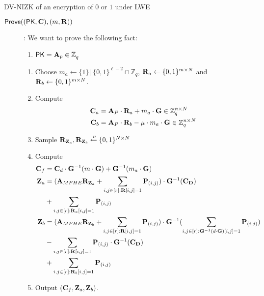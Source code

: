 \begin{subsection}{DV-NIZK of an encryption of $0$ or $1$ under LWE}
\begin{description}
    \item[${\mathsf{Prove}}((\mathsf{PK}, \mathbf{C}), (m, \mathbf{R}))$]:
      We want to prove the following fact:
      \begin{enumerate}
      \item $\mathsf{PK} = \mathbf{A}_p \in \mathbb{Z}_q^{}$
      \end{enumerate}
      \begin{enumerate}
      \item Choose $m_a \gets \{1\}||\{0,1\}^{\ell-2} \cap \mathbb{Z}_q$, $\mathbf{R}_a \gets \{0,1\}^{m \times N}$ and $\mathbf{R}_b \gets \{0,1\}^{m \times N}$.
      \item Compute
        \begin{align*}
          \mathbf{C}_a &= \mathbf{A}_P \cdot \mathbf{R}_a + m_a \cdot \mathbf{G} \in \mathbb{Z}_q^{n \times N}\\
          \mathbf{C}_b &= \mathbf{A}_P \cdot \mathbf{R}_b - \mu \cdot m_a \cdot \mathbf{G} \in \mathbb{Z}_q^{n \times N}          
        \end{align*}
      \item Sample $\mathbf{R}_{\mathbf{Z}_a}, \mathbf{R}_{\mathbf{Z}_b}  \stackrel{{\scriptscriptstyle \mkern4mu R}}{\gets} \{0,1\}^{N\times N}$ 
      \item Compute
        \begin{align*}
          \mathbf{C}_f &= \mathbf{C}_d \cdot \mathbf{G}^{-1}(m \cdot \mathbf{G}) + \mathbf{G}^{-1}(m_a \cdot \mathbf{G})\\
          \mathbf{Z}_a &= (\mathbf{A}_{MFHE} \mathbf{R}_{\mathbf{Z}_a}  + \sum_{i,j\in [r]: \mathbf{R}[i,j] = 1} \mathbf{P}_{(i,j)}) \cdot \mathbf{G}^{-1}(\mathbf{C}_{\mathbf{D}}) \\
          &+ \sum_{i,j \in [r]: \mathbf{R}_a[i,j]= 1}\mathbf{P}_{(i,j)}\\
          \mathbf{Z}_b &= (\mathbf{A}_{MFHE} \mathbf{R}_{\mathbf{Z}_b}  + \sum_{i,j\in [r]: \mathbf{R}[i,j] = 1} \mathbf{P}_{(i,j)}) \cdot \mathbf{G}^{-1}(\sum_{i,j\in [r]: \mathbf{G}^{-1}(d \cdot \mathbf{G})[i,j] = 1} \mathbf{P}_{(i,j)})\\
          &- \sum_{i,j\in [r]: \mathbf{R}[i,j] = 1} \mathbf{P}_{(i,j)} \cdot \mathbf{G}^{-1}(\mathbf{C}_{\mathbf{D}}) \\
          &+ \sum_{i,j \in [r]: \mathbf{R}_b[i,j]= 1}\mathbf{P}_{(i,j)}\\
        \end{align*}
      \item Output $(\mathbf{C}_f, \mathbf{Z}_a, \mathbf{Z}_b)$.
      \end{enumerate}
      

\end{description}
\end{subsection}
